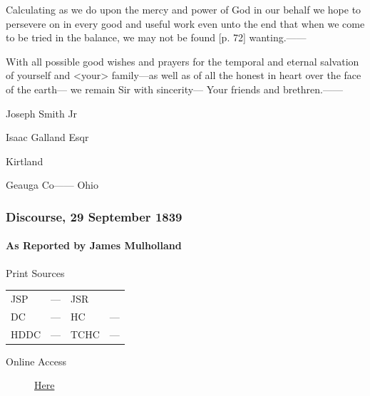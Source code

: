 				Calculating as we do upon the mercy and power of God in our behalf we hope to persevere on in every good and useful work even unto the end that when we come to be tried in the balance, we may not be found [p. 72] wanting.------
				
				With all possible good wishes and prayers for the temporal and eternal salvation of yourself and <your> family---as well as of all the honest in heart over the face of the earth--- we remain Sir with sincerity--- Your friends and brethren.------
				
				\begin{tightright}
					Joseph Smith Jr
				\end{tightright}
				
				Isaac Galland Esqr
				
				Kirtland
				
				Geauga Co------ Ohio
				
		\subsubsection{Discourse, 29 September 1839}
			\label{EMS-1839-JS-29-SEP-1839}
			
			\paragraph{As Reported by James Mulholland}
				\label{EMS-1839-JS-29-SEP-1839-JM}
			
				\begin{description}
					\item[Print Sources]
				\end{description}

					\begin{tabular}{p{0.5in}p{1in}p{0.5in}p{1in}}
					JSP	 	& ---		& JSR 		&  \\
					DC	 	& ---		& HC 		& --- \\
					HDDC 	& ---		& TCHC 		& --- \\
					\end{tabular}
				
				\begin{description}
					\item[Online Access] \href{https://www.josephsmithpapers.org/paper-summary/discourse-29-september-1839-as-reported-by-james-mulholland/1}{Here}
				\end{description}
				

